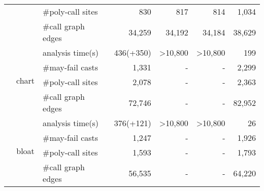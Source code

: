 \begin{table}[]
\begin{tabular}{@{}c|clrrrr@{}}
                                   &                             & \#poly-call sites  & 830                      & 817                         & 814                             & 1,034                          \\
                                   &                             & \#call graph edges & 34,259                   & 34,192                      & 34,184                          & 38,629                         \\ \cmidrule(l){2-7}
                                   & \multirow{4}{*}{chart}      & analysis time(s)   & 436(+350)                      & \textgreater 10,800         & \textgreater 10,800             & 199                             \\
                                   &                             & \#may-fail casts   & 1,331                     & -                           & -                               & 2,299                           \\
                                   &                             & \#poly-call sites  & 2,078                    & -                           & -                               & 2,363                          \\
                                   &                             & \#call graph edges & 72,746                   & -                           & -                               & 82,952                         \\ \cmidrule(l){2-7}
                                   & \multirow{4}{*}{bloat}      & analysis time(s)   & 376(+121)                      & \textgreater 10,800         & \textgreater 10,800             & 26                             \\
                                   &                             & \#may-fail casts   & 1,247                     & -                           & -                               & 1,926                           \\
                                   &                             & \#poly-call sites  & 1,593                    & -                           & -                               & 1,793                          \\
                                   &                             & \#call graph edges & 56,535                   & -                           & -                               & 64,220                         \\ \cmidrule(l){2-7}

\end{tabular}
\end{table}
